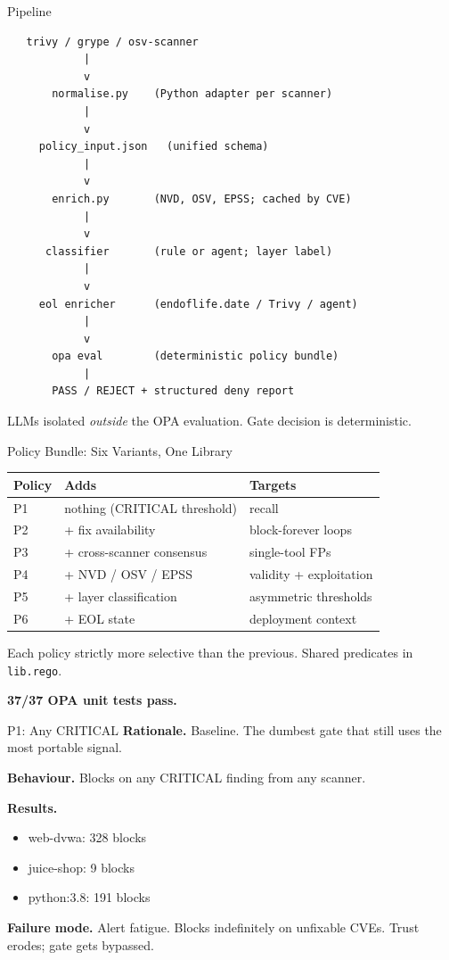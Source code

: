 \documentclass[aspectratio=169]{beamer}
\begin{document}
\begin{frame}[fragile]{Pipeline}
\small
\begin{verbatim}
   trivy / grype / osv-scanner
            |
            v
       normalise.py    (Python adapter per scanner)
            |
            v
     policy_input.json   (unified schema)
            |
            v
       enrich.py       (NVD, OSV, EPSS; cached by CVE)
            |
            v
      classifier       (rule or agent; layer label)
            |
            v
     eol enricher      (endoflife.date / Trivy / agent)
            |
            v
       opa eval        (deterministic policy bundle)
            |
       PASS / REJECT + structured deny report
\end{verbatim}

\medskip
LLMs isolated \emph{outside} the OPA evaluation. Gate decision is deterministic.
\end{frame}

\begin{frame}{Policy Bundle: Six Variants, One Library}
\small
\begin{tabular}{lll}
\toprule
Policy & Adds & Targets \\
\midrule
P1 & nothing (CRITICAL threshold) & recall \\
P2 & + fix availability & block-forever loops \\
P3 & + cross-scanner consensus & single-tool FPs \\
P4 & + NVD / OSV / EPSS & validity + exploitation \\
P5 & + layer classification & asymmetric thresholds \\
P6 & + EOL state & deployment context \\
\bottomrule
\end{tabular}

\medskip
Each policy strictly more selective than the previous. Shared predicates in \texttt{lib.rego}.

\medskip
\textbf{37/37 OPA unit tests pass.}
\end{frame}

\begin{frame}{P1: Any CRITICAL}
\textbf{Rationale.} Baseline. The dumbest gate that still uses the most portable signal.

\medskip
\textbf{Behaviour.} Blocks on any CRITICAL finding from any scanner.

\medskip
\textbf{Results.}
\begin{itemize}
  \item web-dvwa: 328 blocks
  \item juice-shop: 9 blocks
  \item python:3.8: 191 blocks
\end{itemize}

\medskip
\textbf{Failure mode.} Alert fatigue. Blocks indefinitely on unfixable CVEs. Trust erodes; gate gets bypassed.
\end{frame}
\end{document}

